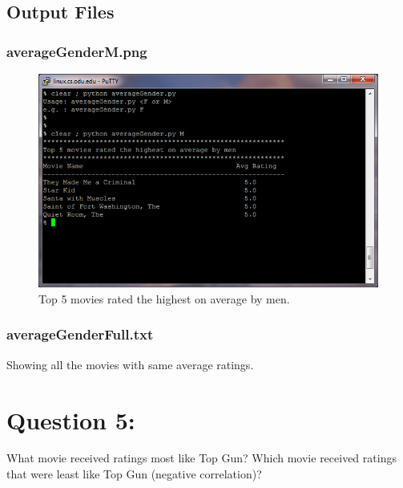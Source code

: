 \documentclass[12pt]{article}
\begin{document}
\subsection{Output Files}
\subsubsection{averageGenderM.png}
\begin{figure}[ht]
\includegraphics[scale=1.0]{../Q4/averageGenderM}
\centering
\caption{Top 5 movies rated the highest on average by men.}
\label{fig:averageGenderM}
\end{figure}
\newpage
\subsubsection{averageGenderFull.txt}
Showing all the movies with same average ratings.

\newpage

\section{Question 5:}
What movie received ratings most like Top Gun? Which movie
received ratings that were least like Top Gun (negative correlation)?
\end{document}
